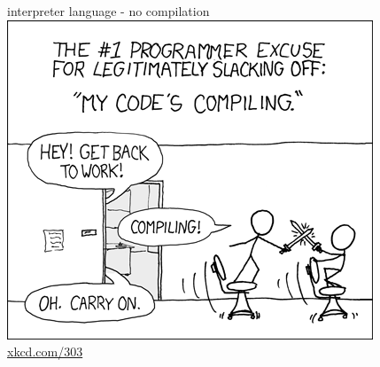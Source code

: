 \documentclass[xcolor=table,       handout,    xcolor=dvipsnames]{beamer}\usepackage[]{graphicx}\usepackage[]{color}
\begin{document}

\begin{frame}{interpreter language - no compilation}
\pause
\centering
\includegraphics[height=0.65\textheight]{externalfig/compiling.png}\\
\href{https://xkcd.com/303/}{xkcd.com/303}
\end{frame}



\end{document}
